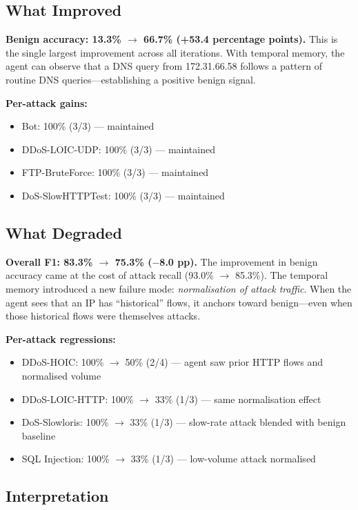 \documentclass[12pt, a4paper, oneside]{report}
\begin{document}
\subsection{What Improved}

\textbf{Benign accuracy: 13.3\% $\rightarrow$ 66.7\% (+53.4 percentage points).}
This is the single largest improvement across all iterations. With temporal
memory, the agent can observe that a DNS query from 172.31.66.58 follows a
pattern of routine DNS queries---establishing a positive benign signal.

\textbf{Per-attack gains:}
\begin{itemize}
  \item Bot: 100\% (3/3) --- maintained
  \item DDoS-LOIC-UDP: 100\% (3/3) --- maintained
  \item FTP-BruteForce: 100\% (3/3) --- maintained
  \item DoS-SlowHTTPTest: 100\% (3/3) --- maintained
\end{itemize}

\subsection{What Degraded}

\textbf{Overall F1: 83.3\% $\rightarrow$ 75.3\% ($-$8.0 pp).}
The improvement in benign accuracy came at the cost of attack recall
(93.0\% $\rightarrow$ 85.3\%). The temporal memory introduced a new failure mode:
\emph{normalisation of attack traffic}. When the agent sees that an IP has
``historical'' flows, it anchors toward benign---even when those historical flows
were themselves attacks.

\textbf{Per-attack regressions:}
\begin{itemize}
  \item DDoS-HOIC: 100\% $\rightarrow$ 50\% (2/4) --- agent saw prior HTTP flows
        and normalised volume
  \item DDoS-LOIC-HTTP: 100\% $\rightarrow$ 33\% (1/3) --- same normalisation
        effect
  \item DoS-Slowloris: 100\% $\rightarrow$ 33\% (1/3) --- slow-rate attack
        blended with benign baseline
  \item SQL Injection: 100\% $\rightarrow$ 33\% (1/3) --- low-volume attack
        normalised
\end{itemize}

\subsection{Interpretation}
\end{document}
